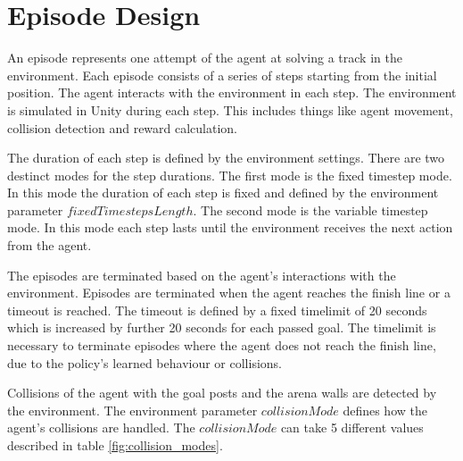 \section{Episode Design}

An episode represents one attempt of the agent at solving a track in the environment. Each episode consists of a series of steps starting from the initial position. The agent interacts with the environment in each step. The environment is simulated in Unity during each step. This includes things like agent movement, collision detection and reward calculation.

The duration of each step is defined by the environment settings. There are two destinct modes for the step durations. The first mode is the fixed timestep mode. In this mode the duration of each step is fixed and defined by the environment parameter $fixedTimestepsLength$. The second mode is the variable timestep mode. In this mode each step lasts until the environment receives the next action from the agent.

\label{time_limit}The episodes are terminated based on the agent's interactions with the environment. Episodes are terminated when the agent reaches the finish line or a timeout is reached. The timeout is defined by a fixed timelimit of 20 seconds which is increased by further 20 seconds for each passed goal. The timelimit is necessary to terminate episodes where the agent does not reach the finish line, due to the policy's learned behaviour or collisions. 

Collisions of the agent with the goal posts and the arena walls are detected by the environment. The environment parameter $collisionMode$ defines how the agent's collisions are handled. The $collisionMode$ can take 5 different values described in table \ref{fig:collision_modes}.

